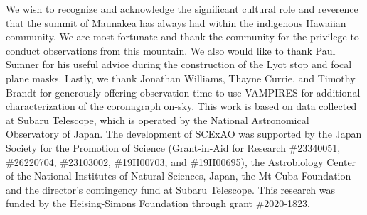 \documentclass[]{spie}  %
\begin{document}
\acknowledgments

We wish to recognize and acknowledge the significant cultural role and reverence that the summit of Maunakea has always had within the indigenous Hawaiian community. We are most fortunate and thank the community for the privilege to conduct observations from this mountain. We also would like to thank Paul Sumner for his useful advice during the construction of the Lyot stop and focal plane masks. Lastly, we thank Jonathan Williams, Thayne Currie, and Timothy Brandt for generously offering observation time to use VAMPIRES for additional characterization of the coronagraph on-sky. This work is based on data collected at Subaru Telescope, which is operated by the National Astronomical Observatory of Japan. The development of SCExAO was supported by the Japan Society for the Promotion of Science (Grant-in-Aid for Research \#23340051, \#26220704, \#23103002, \#19H00703, and \#19H00695), the Astrobiology Center of the National Institutes of Natural Sciences, Japan, the Mt Cuba Foundation and the director's contingency fund at Subaru Telescope. This research was funded by the Heising-Simons Foundation through grant \#2020-1823.


\end{document}
